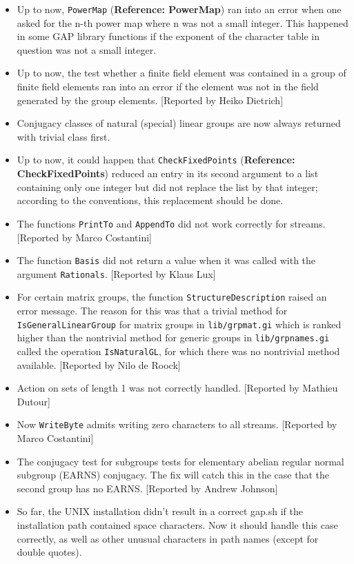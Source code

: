 \documentclass[a4paper,11pt]{report}
\begin{document}
{{\begin{itemize}
factor algebra could be used for (almost) nothing. [Reported by Heiko
Dietrich] 
\item  Up to now, \texttt{PowerMap} (\textbf{Reference: PowerMap}) ran into an error when one asked for the n-th power map where n was not a
small integer. This happened in some \textsf{GAP} library functions if the exponent of the character table in question was not a
small integer. 
\item  Up to now, the test whether a finite field element was contained in a group of
finite field elements ran into an error if the element was not in the field
generated by the group elements. [Reported by Heiko Dietrich] 
\item  Conjugacy classes of natural (special) linear groups are now always returned
with trivial class first. 
\item  Up to now, it could happen that \texttt{CheckFixedPoints} (\textbf{Reference: CheckFixedPoints}) reduced an entry in its second argument to a list containing only one integer
but did not replace the list by that integer; according to the conventions,
this replacement should be done. 
\item  The functions \texttt{PrintTo} and \texttt{AppendTo} did not work correctly for streams. [Reported by Marco Costantini] 
\item  The function \texttt{Basis} did not return a value when it was called with the argument \texttt{Rationals}. [Reported by Klaus Lux] 
\item  For certain matrix groups, the function \texttt{StructureDescription} raised an error message. The reason for this was that a trivial method for \texttt{IsGeneralLinearGroup} for matrix groups in \texttt{lib/grpmat.gi} which is ranked higher than the nontrivial method for generic groups in \texttt{lib/grpnames.gi} called the operation \texttt{IsNaturalGL}, for which there was no nontrivial method available. [Reported by Nilo de
Roock] 
\item  Action on sets of length 1 was not correctly handled. [Reported by Mathieu
Dutour] 
\item  Now \texttt{WriteByte} admits writing zero characters to all streams. [Reported by Marco Costantini] 
\item  The conjugacy test for subgroups tests for elementary abelian regular normal
subgroup (EARNS) conjugacy. The fix will catch this in the case that the
second group has no EARNS. [Reported by Andrew Johnson] 
\item  So far, the UNIX installation didn't result in a correct gap.sh if the
installation path contained space characters. Now it should handle this case
correctly, as well as other unusual characters in path names (except for
double quotes). 
\end{itemize}
 }

}
\end{document}
